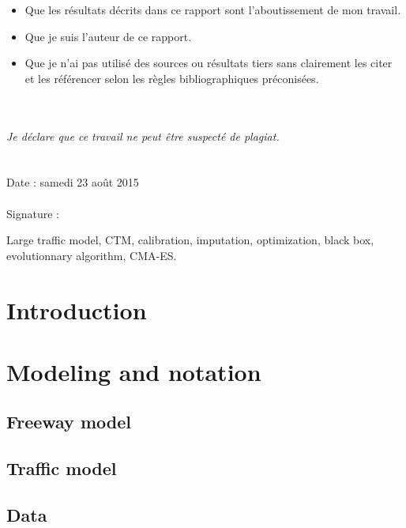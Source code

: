 \begin{itemize}
	\item Que les résultats décrits dans ce rapport sont l’aboutissement de mon travail.

	\item Que je suis l’auteur de ce rapport.

	\item Que je n’ai pas utilisé des sources ou résultats tiers sans clairement les citer et les référencer selon les règles bibliographiques préconisées.
\end{itemize}
~\\
~\\
\emph{Je déclare que ce travail ne peut être suspecté de plagiat.}\\
\\
\\ 
Date :  samedi 23 août 2015
\\
\\
Signature :
 
\newpage
\begin{abstract}

\end{abstract}

\begin{IEEEkeywords}
Large traffic model, CTM, calibration, imputation, optimization, black box, evolutionnary algorithm, CMA-ES.
\end{IEEEkeywords}

\IEEEpeerreviewmaketitle

\section*{Introduction}


\section{Modeling and notation}
\subsection{Freeway model}
\label{subsec:freeway_model}

\subsection{Traffic model}
\label{subsec:traffic_model}

\subsection{Data}
\label{subsec:data}

\newpage
